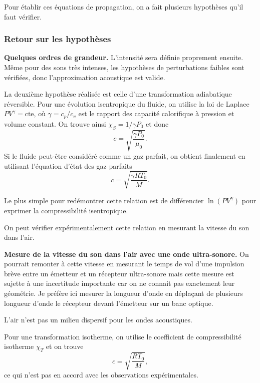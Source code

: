 \begin{transition}
Pour établir ces équations de propagation, on a fait plusieurs hypothèses qu'il faut vérifier.
\end{transition}

\subsubsection{Retour sur les hypothèses}

\begin{slide}
\textbf{Quelques ordres de grandeur.}
L'intensité sera définie proprement ensuite.
Même pour des sons très intenses, les hypothèses de perturbations faibles sont vérifiées, donc l'approximation acoustique est valide.
\end{slide}

La deuxième hypothèse réalisée est celle d'une transformation adiabatique réversible.
Pour une évolution isentropique du fluide, on utilise la loi de Laplace $PV^\gamma = \mathrm{cte}$, où $\gamma=c_p/c_v$ est le rapport des capacité calorifique à pression et volume constant.
On trouve ainsi $\chi_S = 1/\gamma P_0$ et donc
\begin{equation*}
c = \sqrt{\frac{\gamma P_0}{\mu_0}}.
\end{equation*}
Si le fluide peut-être considéré comme un gaz parfait, on obtient finalement en utilisant l'équation d'état des gaz parfaits
\begin{equation}
c = \sqrt{\frac{\gamma RT_0}{M}}.
\end{equation}
\begin{remarque}
Le plus simple pour redémontrer cette relation est de différencier $\ln(PV^\gamma)$ pour exprimer la compressibilité isentropique. 
\end{remarque}

On peut vérifier expérimentalement cette relation en mesurant la vitesse du son dans l'air.
\begin{experience}
\textbf{Mesure de la vitesse du son dans l'air avec une onde ultra-sonore.}
On pourrait remonter à cette vitesse en mesurant le temps de vol d'une impulsion brève entre un émetteur et un récepteur ultra-sonore mais cette mesure est sujette à une incertitude importante car on ne connait pas exactement leur géométrie.
Je préfère ici mesurer la longueur d'onde en déplaçant de plusieurs longueur d'onde le récepteur devant l'émetteur sur un banc optique.
\end{experience}

\begin{remarque}
L'air n'est pas un milieu dispersif pour les ondes acoustiques.
\end{remarque}
\begin{remarque}
Pour une transformation isotherme, on utilise le coefficient de compressibilité isotherme $\chi_T$ et on trouve
\begin{equation*}
c = \sqrt{\frac{RT_0}{M}},
\end{equation*}
ce qui n'est pas en accord avec les observations expérimentales.
\end{remarque}

